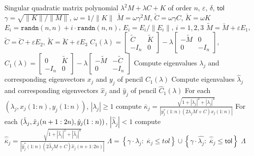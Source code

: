 \documentclass[12pt]{article}
\begin{document}
\begin{algorithm}[H]
\caption{Algorithm for solving singular quadratic eigenvalue problem} 
\begin{algorithmic}[1]
\label{a:mainAlgQEP}
\REQUIRE Singular quadratic matrix polynomial $\lambda^2M+\lambda C + K$ of order $n$, $\varepsilon$, $\delta$, $\mathsf{tol}$
\STATE $\gamma = \sqrt{\|K\|/\|M\|}$, $\omega = 1/\|K\|$
\STATE $\breve{M} = \omega\gamma^2M$, $\breve{C} = \omega\gamma C$, $\breve{K} = \omega K$
\STATE $E_{i} = \texttt{randn}(n,n)+i\cdot\texttt{randn}(n,n)$, $E_i = E_i/\|E_i\|$, $i=1,2,3$
\STATE $\tilde{M} = \breve{M}+\varepsilon E_1$, $\tilde{C} = \breve{C}+\varepsilon E_2$, $\tilde{K} = \breve{K}+\varepsilon E_3$
\STATE $ C_1(\lambda) = \begin{bmatrix} \tilde{C} & \tilde{K}\\ -I_n & 0 \end{bmatrix} - \lambda \begin{bmatrix} -\tilde{M} & 0\\ 0 & -I_n \end{bmatrix} $, $\hat{C}_1(\lambda) =\begin{bmatrix}
        0 & \tilde{K}\\
        -I_n & 0
    \end{bmatrix} - \lambda \begin{bmatrix}
        -\tilde{M} & -\tilde{C}\\
        0 & -I_n
    \end{bmatrix} $
\STATE Compute eigenvalues $\lambda_{j}$ and corresponding eigenvectors $x_{j}$ and $y_{j}$ of pencil $C_1(\lambda)$
\STATE Compute eigenvalues $\hat{\lambda}_{j}$ and corresponding eigenvectors $\hat{x}_{j}$ and $\hat{y}_{j}$ of pencil $\hat{C}_1(\lambda)$
\STATE For each $(\lambda_{j},x_{j}(1:n),y_{j}(1:n))$, $|\lambda_j|\geq 1$ compute $\overline{\kappa}_{j} = \frac{\sqrt{1+|\lambda_j|^2+|\lambda_j|^4}}{|y_j^*(1:n)(2\lambda_j M +C)x_j(1:n)|}$
\STATE For each $\small{(\hat{\lambda}_{j},\hat{x}_{j}(n+1:2n),\hat{y}_{j}(1:n))}$, $|\hat{\lambda}_j|< 1$ compute $\hat{\overline{\kappa}}_{j}= \frac{\sqrt{1+|\hat{\lambda}_j|^2+|\hat{\lambda}_j|^4}}{|\hat{y}_j^*(1:n)(2\hat{\lambda}_j M +C)\hat{x}_j(n+1:2n)|}$
\ENDFOR
\STATE $\Lambda = \left\{ \gamma\cdot \lambda_{j}: \; \overline{\kappa}_{j}\leq tol \right\} \cup \left\{ \gamma\cdot\hat{\lambda_{j}}: \; \hat{\overline{\kappa}}_{j}\leq \mathsf{tol} \right\}$
\RETURN $\Lambda$
\end{algorithmic}
\end{algorithm}
\end{document}
